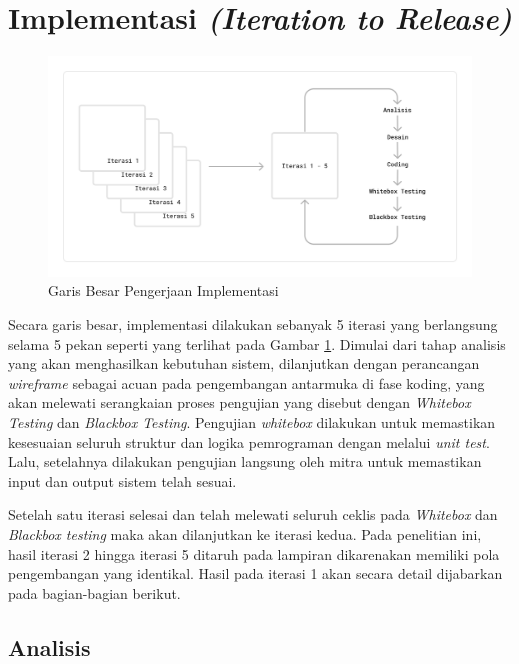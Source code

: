 \section{Implementasi \textit{(Iteration to Release)}}

\begin{figure}[!h]
    \includegraphics[width=1.05\linewidth, center]{images/hasil/overview.png}
    \caption{Garis Besar Pengerjaan Implementasi}
    \label{fig:imp-overview}
\end{figure}

Secara garis besar, implementasi dilakukan sebanyak 5 iterasi yang berlangsung selama 5 pekan seperti yang terlihat pada Gambar \ref{fig:imp-overview}. Dimulai dari tahap analisis yang akan menghasilkan kebutuhan sistem, dilanjutkan dengan perancangan \textit{wireframe} sebagai acuan pada pengembangan antarmuka di fase koding, yang akan melewati serangkaian proses pengujian yang disebut dengan \textit{Whitebox Testing} dan \textit{Blackbox Testing}. Pengujian \textit{whitebox} dilakukan untuk memastikan kesesuaian seluruh struktur dan logika pemrograman dengan melalui \textit{unit test}. Lalu, setelahnya dilakukan pengujian langsung oleh mitra untuk memastikan input dan output sistem telah sesuai.

Setelah satu iterasi selesai dan telah melewati seluruh ceklis pada \textit{Whitebox} dan \textit{Blackbox testing} maka akan dilanjutkan ke iterasi kedua. Pada penelitian ini, hasil iterasi 2 hingga iterasi 5 ditaruh pada lampiran dikarenakan memiliki pola pengembangan yang identikal. Hasil pada iterasi 1 akan secara detail dijabarkan pada bagian-bagian berikut.

\subsection{Analisis}

